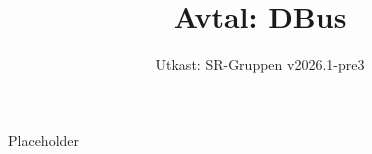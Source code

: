 \documentclass[a4paper]{dtek}
\title{Avtal: DBus}
\date{Utkast: SR-Gruppen v2026.1-pre3}
\begin{document}
Placeholder
\end{document}
